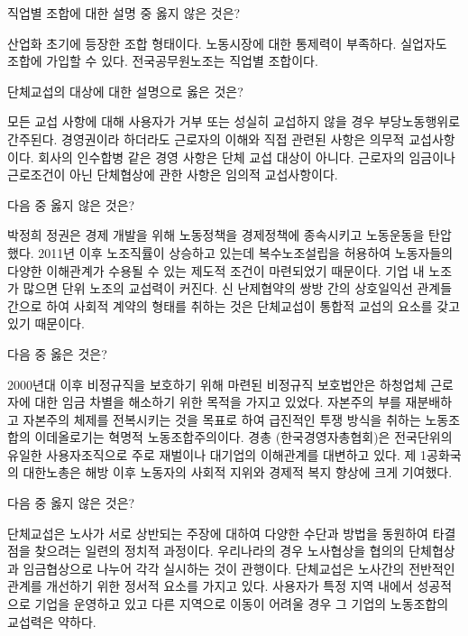 \documentclass[11pt,answers]{exam}
\begin{document}
\begin{questions}
\question[2] 직업별 조합에 대한 설명 중 옳지 않은 것은?
    \begin{choices}
    \choice\relax 산업화 초기에 등장한 조합 형태이다.
    \CorrectChoice\relax 노동시장에 대한 통제력이 부족하다.
    \choice\relax 실업자도 조합에 가입할 수 있다.
    \choice\relax 전국공무원노조는 직업별 조합이다.
    \end{choices}

\question[2] 단체교섭의 대상에 대한 설명으로 옳은 것은?
    \begin{choices}
    \choice\relax 모든 교섭 사항에 대해 사용자가 거부 또는 성실히 교섭하지 않을 경우 부당노동행위로 간주된다.
    \CorrectChoice\relax 경영권이라 하더라도 근로자의 이해와 직접 관련된 사항은 의무적 교섭사항이다.
    \choice\relax 회사의 인수합병 같은 경영 사항은 단체 교섭 대상이 아니다.
    \choice\relax 근로자의 임금이나 근로조건이 아닌 단체협상에 관한 사항은 임의적 교섭사항이다.
    \end{choices}

\question[2] 다음 중 옳지 않은 것은?
    \begin{choices}
    \choice\relax 박정희 정권은 경제 개발을 위해 노동정책을 경제정책에 종속시키고 노동운동을 탄압했다.
    \choice\relax 2011년 이후 노조직률이 상승하고 있는데 복수노조설립을 허용하여 노동자들의 다양한 이해관계가 수용될 수 있는 제도적 조건이 마련되었기 때문이다.
    \CorrectChoice\relax 기업 내 노조가 많으면 단위 노조의 교섭력이 커진다.
    \choice\relax 신 난제협약의 쌍방 간의 상호일익선 관계들 간으로 하여 사회적 계약의 형태를 취하는 것은 단체교섭이 통합적 교섭의 요소를 갖고 있기 때문이다.
    \end{choices}

\question[2] 다음 중 옳은 것은?
    \begin{choices}
    \choice\relax 2000년대 이후 비정규직을 보호하기 위해 마련된 비정규직 보호법안은 하청업체 근로자에 대한 임금 차별을 해소하기 위한 목적을 가지고 있었다.
    \CorrectChoice\relax 자본주의 부를 재분배하고 자본주의 체제를 전복시키는 것을 목표로 하여 급진적인 투쟁 방식을 취하는 노동조합의 이데올로기는 혁명적 노동조합주의이다.
    \choice\relax 경총 (한국경영자총협회)은 전국단위의 유일한 사용자조직으로 주로 재벌이나 대기업의 이해관계를 대변하고 있다.
    \choice\relax 제 1공화국의 대한노총은 해방 이후 노동자의 사회적 지위와 경제적 복지 향상에 크게 기여했다.
    \end{choices}

\question[2] 다음 중 옳지 않은 것은?
    \begin{choices}
    \choice\relax 단체교섭은 노사가 서로 상반되는 주장에 대하여 다양한 수단과 방법을 동원하여 타결점을 찾으려는 일련의 정치적 과정이다.
    \choice\relax 우리나라의 경우 노사협상을 협의의 단체협상과 임금협상으로 나누어 각각 실시하는 것이 관행이다.
    \choice\relax 단체교섭은 노사간의 전반적인 관계를 개선하기 위한 정서적 요소를 가지고 있다.
    \CorrectChoice\relax 사용자가 특정 지역 내에서 성공적으로 기업을 운영하고 있고 다른 지역으로 이동이 어려울 경우 그 기업의 노동조합의 교섭력은 약하다.
    \end{choices}


\end{questions}
\end{document}
